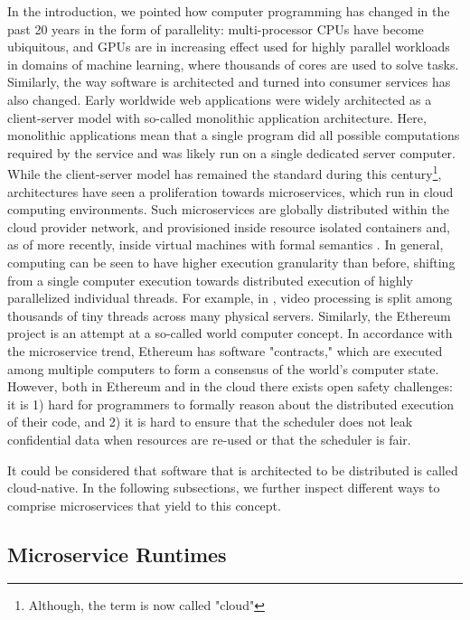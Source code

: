 \documentclass{IEEEtran}
\begin{document}
In the introduction, we pointed how computer programming has changed in the past 20 years in the form of parallelity: multi-processor CPUs have become ubiquitous, and GPUs are in increasing effect used for highly parallel workloads in domains of machine learning, where thousands of cores are used to solve tasks. Similarly, the way software is architected and turned into consumer services has also changed. Early worldwide web applications were widely architected as a client-server model with so-called monolithic application architecture. Here, monolithic applications mean that a single program did all possible computations required by the service and was likely run on a single dedicated server computer. While the client-server model has remained the standard during this century\footnote{Although, the term is now called "cloud"}, architectures have seen a proliferation towards microservices, which run in cloud computing environments. Such microservices are globally distributed within the cloud provider network, and provisioned inside resource isolated containers \cite{burns2016borg} and, as of more recently, inside virtual machines with formal semantics \cite{haas2017bringing, watt2018mechanising}. In general, computing can be seen to have higher execution granularity than before, shifting from a single computer execution towards distributed execution of highly parallelized individual threads. For example, in \cite{fouladi2017encoding}, video processing is split among thousands of tiny threads across many physical servers. Similarly, the Ethereum project is an attempt at a so-called world computer concept. In accordance with the microservice trend, Ethereum has software "contracts," which are executed among multiple computers to form a consensus of the world's computer state. However, both in Ethereum and in the cloud there exists open safety challenges: it is 1) hard for programmers to formally reason about the distributed execution of their code, and 2) it is hard to ensure that the scheduler does not leak confidential data when resources are re-used \cite{jangda2019formal} or that the scheduler is fair.

It could be considered that software that is architected to be distributed is called cloud-native. In the following subsections, we further inspect different ways to comprise microservices that yield to this concept.

\subsection{Microservice Runtimes}
\end{document}
